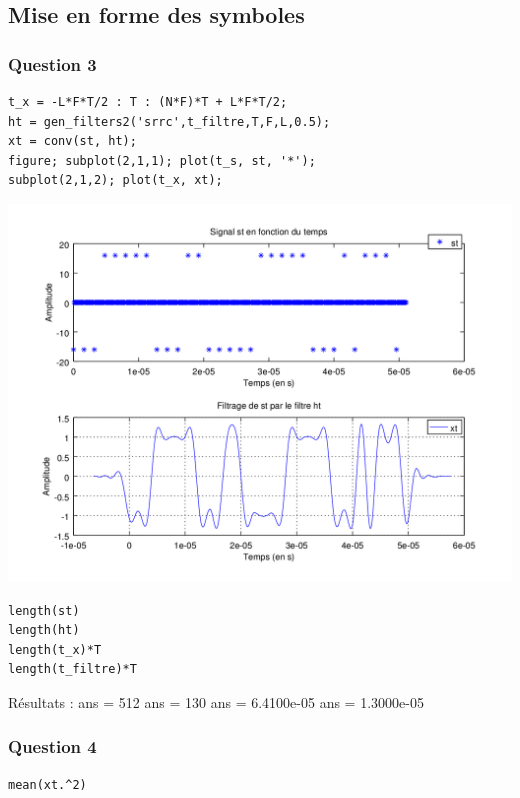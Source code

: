 \documentclass{acm_proc_article-sp}
\begin{document}
\subsection{Mise en forme des symboles}

\subsubsection{Question 3}
\begin{lstlisting}
t_x = -L*F*T/2 : T : (N*F)*T + L*F*T/2;
ht = gen_filters2('srrc',t_filtre,T,F,L,0.5);
xt = conv(st, ht);
figure; subplot(2,1,1); plot(t_s, st, '*');
subplot(2,1,2); plot(t_x, xt);
\end{lstlisting}

\begin{center}
\includegraphics[scale=0.45]{conv_3_3.png}
\end{center}

\begin{lstlisting}
length(st)
length(ht)
length(t_x)*T
length(t_filtre)*T
\end{lstlisting}

Résultats : ans =  512
ans =  130
ans =    6.4100e-05
ans =    1.3000e-05

\subsubsection{Question 4}
\begin{lstlisting}
mean(xt.^2)
\end{lstlisting}
\end{document}
